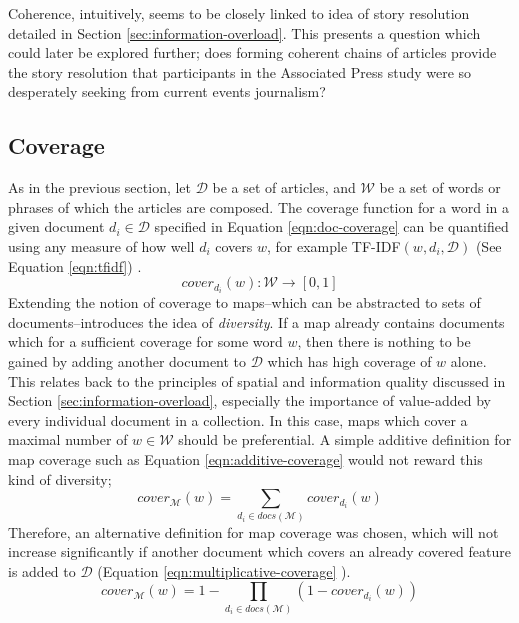 Coherence, intuitively, seems to be closely linked to idea of story resolution detailed in Section \ref{sec:information-overload}. This presents a question which could later be explored further; does forming coherent chains of articles provide the story resolution that participants in the Associated Press study were so desperately seeking from current events journalism?
	
\subsection{Coverage}
As in the previous section, let $\mathcal{D}$ be a set of articles, and $\mathcal{W}$ be a set of words or phrases of which the articles are composed. The coverage function for a word in a given document $d_i \in \mathcal{D}$ specified in Equation \ref{eqn:doc-coverage} can be quantified using any measure of how well $d_i$ covers $w$, for example TF-IDF$(w, d_i, \mathcal{D})$ (See Equation \ref{eqn:tfidf}) \citep{GeneratingInformationMaps}.
\begin{equation}
	\label{eqn:doc-coverage}
	cover_{d_i}(w) : \mathcal{W} \rightarrow [0,1]
\end{equation}
Extending the notion of coverage to maps--which can be abstracted to sets of documents--introduces the idea of \textit{diversity}. If a map already contains documents which for a sufficient coverage for some word $w$, then there is nothing to be gained by adding another document to $\mathcal{D}$ which has high coverage of $w$ alone. This relates back to the principles of spatial and information quality discussed in Section \ref{sec:information-overload}, especially the importance of value-added by every individual document in a collection. In this case, maps which cover a maximal number of $w \in \mathcal{W}$ should be preferential. A simple additive definition for map coverage such as Equation \ref{eqn:additive-coverage} \citep{GeneratingInformationMaps} would not reward this kind of diversity;
\begin{equation}
	\label{eqn:additive-coverage}
	cover_\mathcal{M}(w) = \sum_{d_i\in docs(\mathcal{M})}cover_{d_i}(w)
\end{equation}
Therefore, an alternative definition for map coverage was chosen, which will not increase significantly if another document which covers an already covered feature is added to $\mathcal{D}$ (Equation \ref{eqn:multiplicative-coverage} \citep{GeneratingInformationMaps}).
\begin{equation}
	\label{eqn:multiplicative-coverage}
	cover_\mathcal{M}(w) = 1 - \prod_{d_i\in docs(\mathcal{M})}(1-cover_{d_i}(w))
\end{equation}
